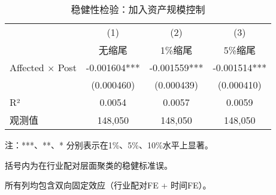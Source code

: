 \begin{table}[htbp]
\centering
\begin{threeparttable}
\caption{稳健性检验：加入资产规模控制}
\label{tab:robustness_assets}
\begin{tabular}{lccc}
\hline\hline
 & (1) & (2) & (3) \\
 & 无缩尾 & 1\%缩尾 & 5\%缩尾 \\
\hline
Affected $\times$ Post & -0.001604*** & -0.001559*** & -0.001514*** \\
 & (0.000460) & (0.000439) & (0.000410) \\
\hline
R² & 0.0054 & 0.0057 & 0.0059 \\
观测值 & 148,050 & 148,050 & 148,050 \\
\hline\hline
\end{tabular}
\begin{tablenotes}
\small
\item 注：***、**、* 分别表示在1\%、5\%、10\%水平上显著。
\item 括号内为在行业配对层面聚类的稳健标准误。
\item 所有列均包含双向固定效应（行业配对FE + 时间FE）。
\end{tablenotes}
\end{threeparttable}
\end{table}